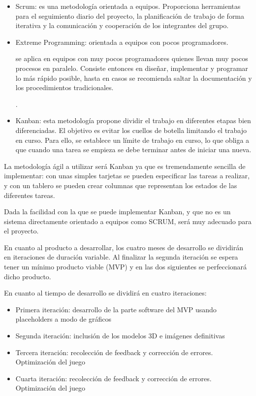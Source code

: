 \begin{itemize}
	\item Scrum: es una metodología orientada a equipos. Proporciona herramientas para el seguimiento diario del proyecto, la planificación de trabajo de forma iterativa y la comunicación y cooperación de los integrantes del grupo.
	\item Extreme Programming: orientada a equipos con pocos programadores. 
		\begin{itquote}
			se aplica en equipos con muy pocos programadores quienes llevan muy pocos procesos en paralelo. Consiste entonces en diseñar, implementar y programar lo más rápido posible, hasta en casos se recomienda saltar la documentación y los procedimientos tradicionales.
			\begin{flushright}
	 			\cite{opheliapastrana2015}.
 			\end{flushright}
		\end{itquote}
	\item Kanban: esta metodología propone dividir el trabajo en diferentes etapas bien diferenciadas. El objetivo es evitar los cuellos de botella limitando el trabajo en curso. Para ello, se establece un límite de trabajo en curso, lo que obliga a que cuando una tarea se empieza se debe terminar antes de iniciar una nueva.
\end{itemize}

La metodología ágil a utilizar será Kanban ya que es tremendamente sencilla de implementar: con unas simples tarjetas se pueden especificar las tareas a realizar, y con un tablero se pueden crear columnas que representan los estados de las diferentes tareas.

Dada la facilidad con la que se puede implementar Kanban, y que no es un sistema directamente orientado a equipos como SCRUM, será muy adecuado para el proyecto.


En cuanto al producto a desarrollar, los cuatro meses de desarrollo se dividirán en iteraciones de duración variable. Al finalizar la segunda iteración se espera tener un mínimo producto viable (MVP) y en las dos siguientes se perfeccionará dicho producto.

En cuanto al tiempo de desarrollo se dividirá en cuatro iteraciones: 

\begin{itemize}
	\item Primera iteración: desarrollo de la parte software del MVP usando placeholders a modo de gráficos 
	\item Segunda iteración: inclusión de los modelos 3D e imágenes definitivas
	\item Tercera iteración: recolección de feedback y corrección de errores. Optimización del juego
	\item Cuarta iteración: recolección de feedback y corrección de errores. Optimización del juego
\end{itemize}

